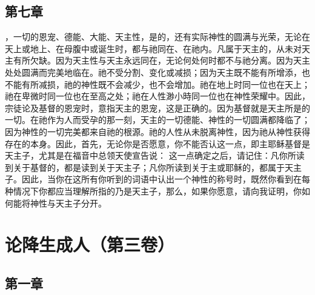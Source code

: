 
\subsection{第七章}

\par

，一切的恩宠、德能、大能、天主性，是的，还有实际神性的圆满与光荣，无论在天上或地上、在母腹中或诞生时，都与祂同在、在祂内。凡属于天主的，从未对天主有所欠缺。因为天主性与天主永远同在，无论何处何时都不与祂分离。因为天主处处圆满而完美地临在。祂不受分割、变化或减损；因为天主既不能有所增添，也不能有所减损，祂的神性既不会减少，也不会增加。祂在地上时同一位也在天上；祂在卑微时同一位也在至高之处；祂在人性渺小時同一位也在神性荣耀中。因此，宗徒论及基督的恩宠时，意指天主的恩宠，这是正确的。因为基督就是天主所是的一切。在祂作为人而受孕的那一刻，天主的一切德能、神性的一切圆满都降临了；因为神性的一切完美都来自祂的根源。祂的人性从未脱离神性，因为祂从神性获得存在的本身。因此，首先，无论你是否愿意，你不能否认这一点，即主耶稣基督是天主子，尤其是在福音中总领天使宣告说： 这一点确定之后，请记住：凡你所读到关于基督的，都是读到关于天主子；凡你所读到关于主或耶稣的，都属于天主子。因此，当你在这所有你听到的词语中认出一个神性的称号时，既然你看到在每种情况下你都应当理解所指的乃是天主子，那么，如果你愿意，请向我证明，你如何能将神性与天主子分开。\par



\section{论降生成人（第三卷）}


\subsection{第一章}


